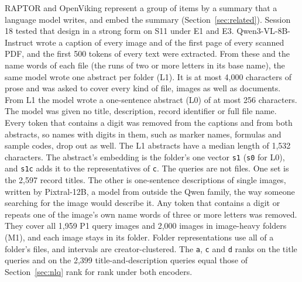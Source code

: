 \documentclass[11pt]{article}
\newcommand{\rep}[1]{\texttt{#1}}
\begin{document}
RAPTOR and OpenViking represent a group of items by a summary that a language model writes, and embed the summary (Section~\ref{sec:related}). Session 18 tested that design in a strong form on S11 under E1 and E3. Qwen3-VL-8B-Instruct wrote a caption of every image and of the first page of every scanned PDF, and the first 500 tokens of every text were extracted. From these and the name words of each file (the runs of two or more letters in its base name), the same model wrote one abstract per folder (L1). It is at most 4,000 characters of prose and was asked to cover every kind of file, images as well as documents. From L1 the model wrote a one-sentence abstract (L0) of at most 256 characters. The model was given no title, description, record identifier or full file name. Every token that contains a digit was removed from the captions and from both abstracts, so names with digits in them, such as marker names, formulas and sample codes, drop out as well. The L1 abstracts have a median length of 1,532 characters. The abstract's embedding is the folder's one vector \rep{s1} (\rep{s0} for L0), and \rep{s1c} adds it to the representatives of \rep{c}. The queries are not files. One set is the 2,597 record titles. The other is one-sentence descriptions of single images, written by Pixtral-12B, a model from outside the Qwen family, the way someone searching for the image would describe it. Any token that contains a digit or repeats one of the image's own name words of three or more letters was removed. They cover all 1,959 P1 query images and 2,000 images in image-heavy folders (M1), and each image stays in its folder. Folder representations use all of a folder's files, and intervals are creator-clustered. The \rep{a}, \rep{c} and \rep{d} ranks on the title queries and on the 2,399 title-and-description queries equal those of Section~\ref{sec:nlq} rank for rank under both encoders.
\end{document}

